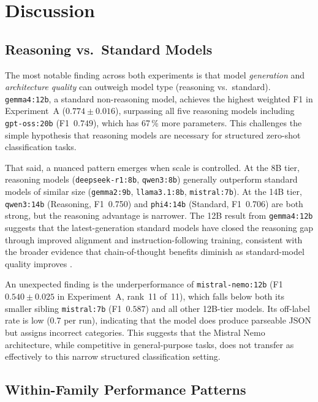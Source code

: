 \documentclass[journal]{IEEEtran}
\begin{document}
\section{Discussion}
\label{sec:discussion}

\subsection{Reasoning vs.\ Standard Models}

The most notable finding across both experiments is that model
\emph{generation} and \emph{architecture quality} can outweigh model
type (reasoning vs.\ standard). \texttt{gemma4:12b}, a standard
non-reasoning model, achieves the highest weighted F1 in
Experiment~A ($0.774 \pm 0.016$), surpassing all five reasoning models
including \texttt{gpt-oss:20b} (F1~$0.749$), which has 67\,\% more
parameters. This challenges the simple hypothesis that reasoning models
are necessary for structured zero-shot classification tasks.

That said, a nuanced pattern emerges when scale is controlled.
At the 8B tier, reasoning models (\texttt{deepseek-r1:8b},
\texttt{qwen3:8b}) generally outperform standard models of similar
size (\texttt{gemma2:9b}, \texttt{llama3.1:8b}, \texttt{mistral:7b}).
At the 14B tier, \texttt{qwen3:14b} (Reasoning, F1~0.750) and
\texttt{phi4:14b} (Standard, F1~0.706) are both strong, but the
reasoning advantage is narrower. The 12B result from \texttt{gemma4:12b}
suggests that the latest-generation standard models have closed the
reasoning gap through improved alignment and instruction-following
training, consistent with the broader evidence that chain-of-thought
benefits diminish as standard-model quality improves
\cite{wei2022chainofthought,guo2025deepseekr1}.

An unexpected finding is the underperformance of \texttt{mistral-nemo:12b}
(F1~$0.540 \pm 0.025$ in Experiment~A, rank~11 of~11), which falls
below both its smaller sibling \texttt{mistral:7b} (F1~$0.587$) and
all other 12B-tier models. Its off-label rate is low (0.7 per run),
indicating that the model does produce parseable JSON but assigns
incorrect categories. This suggests that the Mistral Nemo architecture,
while competitive in general-purpose tasks, does not transfer as
effectively to this narrow structured classification setting.

\subsection{Within-Family Performance Patterns}
\end{document}

